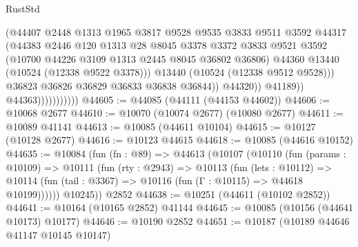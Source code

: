 \begin{lexlean}{RustStd}
\begin{coremodule}
                                      (@44407
                                        @2448
                                        @1313
                                        @1965
                                        @3817
                                        @9528
                                        @9535
                                        @3833
                                        @9511
                                        @3592
                                        @44317
                                        (@44383
                                          @2446
                                          @120
                                          @1313
                                          @28
                                          @8045
                                          @3378
                                          @3372
                                          @3833
                                          @9521
                                          @3592
                                          (@10700 @44226 @3109 @1313 @2445 @8045 @36802 @36806)
                                          @44360
                                          @13440
                                          (@10524 (@12338 @9522 @3378)))
                                        @13440
                                        (@10524 (@12338 @9512 @9528)))
                                      @36823
                                      @36826
                                      @36829
                                      @36833
                                      @36838
                                      @36844))
                                  @44320))
                              @41189))
                          @44363)))))))))))
@44605 := @44085 (@44111 (@44153 @44602))
@44606 := @10068 @2677
@44610 := @10070 (@10074 @2677) (@10080 @2677)
@44611 := @10089 @41141
@44613 := @10085 (@44611 @10104)
@44615 := @10127 (@10128 @2677)
@44616 := @10123 @44615
@44618 := @10085 (@44616 @10152)
@44635 := @10084
    (fun (fn : @89) =>
    @44613
      (@10107
        (@10110
          (fun (params : @10109) =>
          @10111
            (fun (rty : @2943) =>
            @10113
              (fun (lets : @10112) =>
              @10114 (fun (tail : @3367) => @10116 (fun (Γ : @10115) => @44618 @10199))))))
        @10245))
    @2852
@44638 := @10251 (@44611 (@10102 @2852))
@44641 := @10164 (@10165 @2852) @41144
@44645 := @10085 (@10156 (@44641 @10173) @10177)
@44646 := @10190 @2852
@44651 := @10187 (@10189 @44646 @41147 @10145 @10147)

\end{coremodule}
\end{lexlean}
